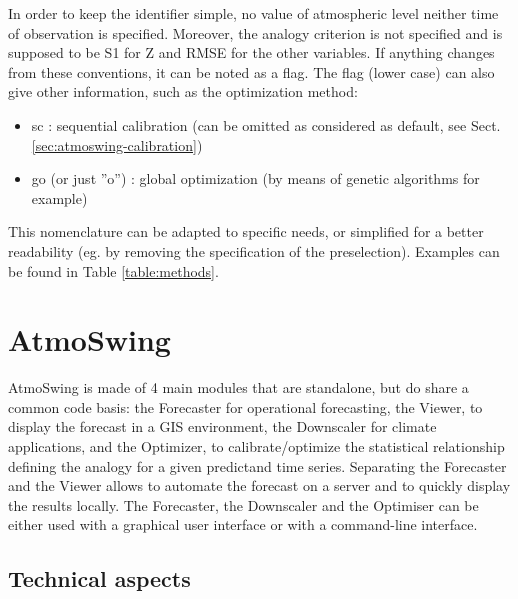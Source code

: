 \documentclass[review]{elsarticle}
\begin{document}
In order to keep the identifier simple, no value of atmospheric level neither time of observation is specified. Moreover, the analogy criterion is not specified and is supposed to be S1 for Z and RMSE for the other variables. If anything changes from these conventions, it can be noted as a flag. The flag (lower case) can also give other information, such as the optimization method:
\begin{itemize}
	\item sc : sequential calibration (can be omitted as considered as default, see Sect. \ref{sec:atmoswing-calibration})
	\item go (or just ''o'') : global optimization (by means of genetic algorithms for example)
\end{itemize}

This nomenclature can be adapted to specific needs, or simplified for a better readability (eg. by removing the specification of the preselection). Examples can be found in Table \ref{table:methods}.


\section{AtmoSwing}
\label{sec:atmoswing}

AtmoSwing is made of 4 main modules that are standalone, but do share a common code basis: the Forecaster for operational forecasting, the Viewer, to display the forecast in a GIS environment, the Downscaler for climate applications, and the Optimizer, to calibrate/optimize the statistical relationship defining the analogy for a given predictand time series. Separating the Forecaster and the Viewer allows to automate the forecast on a server and to quickly display the results locally. The Forecaster, the Downscaler and the Optimiser can be either used with a graphical user interface or with a command-line interface.


\subsection{Technical aspects}
\end{document}
